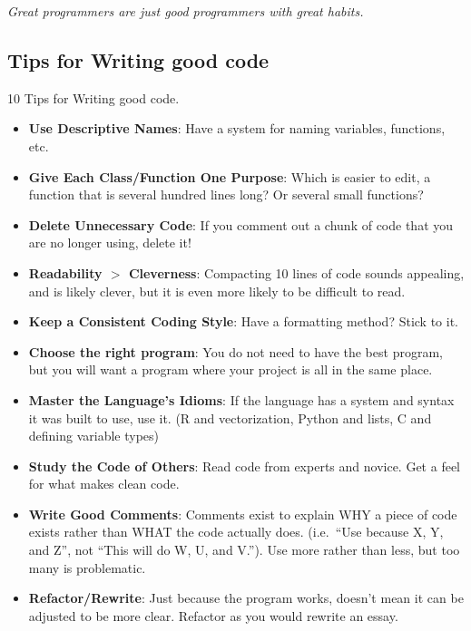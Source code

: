 \documentclass[
]{book}
\begin{document}
\emph{Great programmers are just good programmers with great habits.}

\hypertarget{tips-for-writing-good-code}{%
\subsection*{Tips for Writing good code}\label{tips-for-writing-good-code}}

10 Tips for Writing good code.

\begin{itemize}
\item
  \textbf{Use Descriptive Names}: Have a system for naming variables, functions, etc.
\item
  \textbf{Give Each Class/Function One Purpose}: Which is easier to edit, a function that is several hundred lines long? Or several small functions?
\item
  \textbf{Delete Unnecessary Code}: If you comment out a chunk of code that you are no longer using, delete it!
\item
  \textbf{Readability \(>\) Cleverness}: Compacting 10 lines of code sounds appealing, and is likely clever, but it is even more likely to be difficult to read.
\item
  \textbf{Keep a Consistent Coding Style}: Have a formatting method? Stick to it.
\item
  \textbf{Choose the right program}: You do not need to have the best program, but you will want a program where your project is all in the same place.
\item
  \textbf{Master the Language's Idioms}: If the language has a system and syntax it was built to use, use it. (R and vectorization, Python and lists, C and defining variable types)
\item
  \textbf{Study the Code of Others}: Read code from experts and novice. Get a feel for what makes clean code.
\item
  \textbf{Write Good Comments}: Comments exist to explain WHY a piece of code exists rather than WHAT the code actually does. (i.e.~``Use because X, Y, and Z'', not ``This will do W, U, and V.''). Use more rather than less, but too many is problematic.
\item
  \textbf{Refactor/Rewrite}: Just because the program works, doesn't mean it can be adjusted to be more clear. Refactor as you would rewrite an essay.
\end{itemize}
\end{document}
